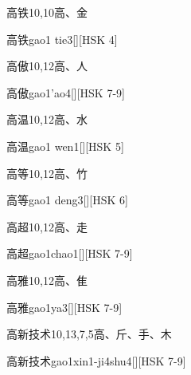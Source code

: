 \begin{Entry}{高铁}{10,10}{⾼、⾦}
  \begin{Phonetics}{高铁}{gao1 tie3}[][HSK 4]
  \end{Phonetics}
\end{Entry}

\begin{Entry}{高傲}{10,12}{⾼、⼈}
  \begin{Phonetics}{高傲}{gao1'ao4}[][HSK 7-9]
  \end{Phonetics}
\end{Entry}

\begin{Entry}{高温}{10,12}{⾼、⽔}
  \begin{Phonetics}{高温}{gao1 wen1}[][HSK 5]
  \end{Phonetics}
\end{Entry}

\begin{Entry}{高等}{10,12}{⾼、⽵}
  \begin{Phonetics}{高等}{gao1 deng3}[][HSK 6]
  \end{Phonetics}
\end{Entry}

\begin{Entry}{高超}{10,12}{⾼、⾛}
  \begin{Phonetics}{高超}{gao1chao1}[][HSK 7-9]
  \end{Phonetics}
\end{Entry}

\begin{Entry}{高雅}{10,12}{⾼、⾫}
  \begin{Phonetics}{高雅}{gao1ya3}[][HSK 7-9]
  \end{Phonetics}
\end{Entry}

\begin{Entry}{高新技术}{10,13,7,5}{⾼、⽄、⼿、⽊}
  \begin{Phonetics}{高新技术}{gao1xin1-ji4shu4}[][HSK 7-9]
  \end{Phonetics}
\end{Entry}

